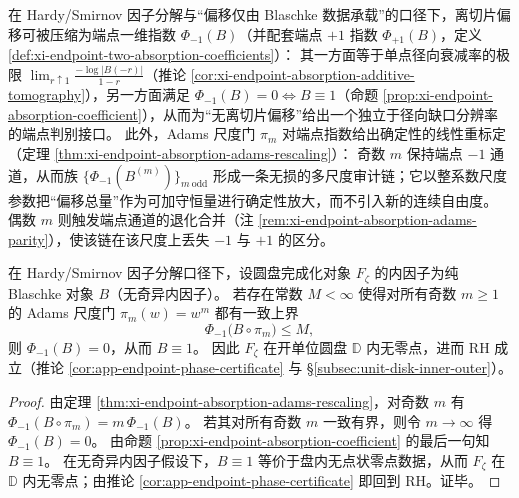 \begin{remark}\label{rem:xi-endpoint-absorption-terminal-index}
在 Hardy/Smirnov 因子分解与“偏移仅由 Blaschke 数据承载”的口径下，离切片偏移可被压缩为端点一维指数 \(\Phi_{-1}(B)\)（并配套端点 \(+1\) 指数 \(\Phi_{+1}(B)\)，定义 \ref{def:xi-endpoint-two-absorption-coefficients}）：
其一方面等于单点径向衰减率的极限 \(\lim_{r\uparrow 1}\frac{-\log|B(-r)|}{1-r}\)（推论 \ref{cor:xi-endpoint-absorption-additive-tomography}），另一方面满足 \(\Phi_{-1}(B)=0\iff B\equiv 1\)（命题 \ref{prop:xi-endpoint-absorption-coefficient}），从而为“无离切片偏移”给出一个独立于径向缺口分辨率的端点判别接口。
此外，Adams 尺度门 \(\pi_m\) 对端点指数给出确定性的线性重标定（定理 \ref{thm:xi-endpoint-absorption-adams-rescaling}）：
奇数 \(m\) 保持端点 \(-1\) 通道，从而族 \(\{\Phi_{-1}(B^{(m)})\}_{m\ \mathrm{odd}}\) 形成一条无损的多尺度审计链；它以整系数尺度参数把“偏移总量”作为可加守恒量进行确定性放大，而不引入新的连续自由度。
偶数 \(m\) 则触发端点通道的退化合并（注 \ref{rem:xi-endpoint-absorption-adams-parity}），使该链在该尺度上丢失 \(-1\) 与 \(+1\) 的区分。
\end{remark}

\begin{theorem}[多尺度一致性 \texorpdfstring{$\Longrightarrow$}{=>} 固定切片承载：奇数 Adams 门端点预算一致上界的充分条件]\label{thm:xi-multiscale-consistency-implies-rh}
在 Hardy/Smirnov 因子分解口径下，设圆盘完成化对象 \(F_\zeta\) 的内因子为纯 Blaschke 对象 \(B\)（无奇异内因子）。
若存在常数 \(M<\infty\) 使得对所有奇数 \(m\ge 1\) 的 Adams 尺度门 \(\pi_m(w)=w^m\) 都有一致上界
\[
\Phi_{-1}\bigl(B\circ \pi_m\bigr)\le M,
\]
则 \(\Phi_{-1}(B)=0\)，从而 \(B\equiv 1\)。
因此 \(F_\zeta\) 在开单位圆盘 \(\mathbb{D}\) 内无零点，进而 RH 成立（推论 \ref{cor:app-endpoint-phase-certificate} 与 \S\ref{subsec:unit-disk-inner-outer}）。
\end{theorem}

\begin{proof}
由定理 \ref{thm:xi-endpoint-absorption-adams-rescaling}，对奇数 \(m\) 有
\(
\Phi_{-1}(B\circ\pi_m)=m\,\Phi_{-1}(B)
\)。
若其对所有奇数 \(m\) 一致有界，则令 \(m\to\infty\) 得 \(\Phi_{-1}(B)=0\)。
由命题 \ref{prop:xi-endpoint-absorption-coefficient} 的最后一句知 \(B\equiv 1\)。
在无奇异内因子假设下，\(B\equiv 1\) 等价于盘内无点状零点数据，从而 \(F_\zeta\) 在 \(\mathbb{D}\) 内无零点；由推论 \ref{cor:app-endpoint-phase-certificate} 即回到 RH。证毕。
\end{proof}

